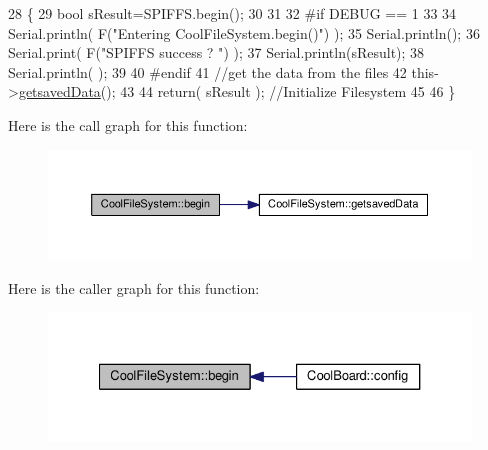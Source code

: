 \begin{DoxyCode}
28 \{
29     \textcolor{keywordtype}{bool} sResult=SPIFFS.begin();
30     
31 
32 \textcolor{preprocessor}{#if DEBUG == 1}
33 
34     Serial.println( F(\textcolor{stringliteral}{"Entering CoolFileSystem.begin()"}) );
35     Serial.println();   
36     Serial.print( F(\textcolor{stringliteral}{"SPIFFS success ? "}) );
37     Serial.println(sResult);
38     Serial.println(  );
39 
40 \textcolor{preprocessor}{#endif}
41     \textcolor{comment}{//get the data from the files}
42     this->\hyperlink{class_cool_file_system_a70701d05e811604af1b531f4f6dc69ed}{getsavedData}();
43 
44     \textcolor{keywordflow}{return}( sResult  );                                   \textcolor{comment}{//Initialize Filesystem}
45 
46 \}
\end{DoxyCode}
Here is the call graph for this function\+:
\nopagebreak
\begin{figure}[H]
\begin{center}
\leavevmode
\includegraphics[width=350pt]{db/d0c/class_cool_file_system_a6ba6f666ed4c530174f8569d2c636748_cgraph}
\end{center}
\end{figure}
Here is the caller graph for this function\+:
\nopagebreak
\begin{figure}[H]
\begin{center}
\leavevmode
\includegraphics[width=327pt]{db/d0c/class_cool_file_system_a6ba6f666ed4c530174f8569d2c636748_icgraph}
\end{center}
\end{figure}
\mbox{\label{class_cool_file_system_a13f2958f5b87757c31fc53797a30d23a}} 
